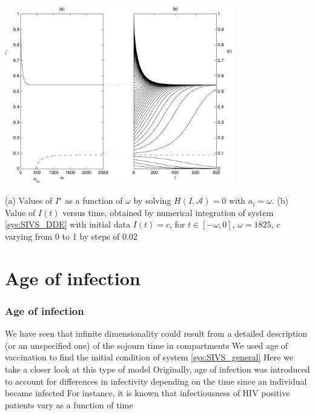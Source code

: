 \documentclass[aspectratio=169]{beamer}\usepackage[]{graphicx}\usepackage[]{xcolor}
\begin{document}
\begin{frame}
\begin{center}
   \includegraphics[width=0.75\textwidth]{FIGS/bif_and_time}
\end{center}
(a) Values of $I^\star$ as a function of $\omega$ by solving $H(I,\mathcal{A})=0$ with $a_i=\omega$. (b) Value of $I(t)$ versus time, obtained by numerical integration of system \eqref{sys:SIVS_DDE} with initial data $I(t)=c$, for $t\in[-\omega,0]$, $\omega=1825$, $c$ varying from 0 to 1 by steps of 0.02
\end{frame}


\section{Age of infection}
\begin{frame}\frametitle{Age of infection}
We have seen that infinite dimensionality could result from a detailed description (or an unspecified one) of the sojourn time in compartments
\vfill
We used age of vaccination to find the initial condition of system \eqref{sys:SIVS_general}
\vfill
Here we take a closer look at this type of model
\vfill
Originally, age of infection was introduced to account for differences in infectivity depending on the time since an individual became infected
\vfill
For instance, it is known that infectiousness of HIV positive patients vary as a function of time
\end{frame}

\end{document}
